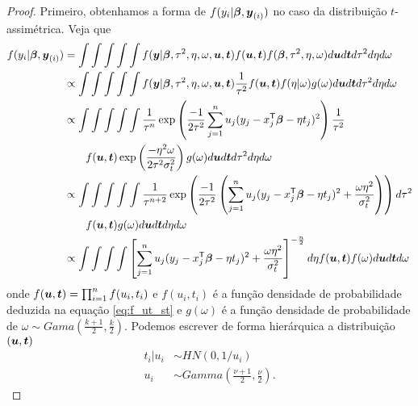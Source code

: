 \begin{proof}
Primeiro, obtenhamos a forma de  $f(y_i|{\boldsymbol{\beta}},{\boldsymbol{y}_{(i)}})$ no caso da distribuição $t$-assimétrica. Veja que 
\begin{equation}\label{eq:st_marg_1}
\begin{split}
f(y_i|{\boldsymbol{\beta}},{\boldsymbol{y}_{(i)}})  &= \int\int\int\int\int f({\boldsymbol{y}}|{\boldsymbol{\beta}},{\tau^2},\eta,\omega,{\boldsymbol{u}},{\boldsymbol{t}})f({\boldsymbol{u}},{\boldsymbol{t}}) f({\boldsymbol{\beta}},{\tau^2},\eta,\omega) d{\boldsymbol{u}} d{\boldsymbol{t}} d{\tau^2} d\eta d\omega \\
{}&\propto \int\int\int\int\int f({\boldsymbol{y}}|{\boldsymbol{\beta}},{\tau^2},\eta,\omega,{\boldsymbol{u}},{\boldsymbol{t}})\frac{1}{{\tau^2}}f({\boldsymbol{u}},{\boldsymbol{t}})f(\eta|\omega)g(\omega) d{\boldsymbol{u}} d{\boldsymbol{t}} d{\tau^2} d\eta d\omega  \\
{}& \propto  \int\int\int\int\int \frac{1}{\tau^n}\exp\left(\frac{-1}{2{\tau^2}}\sum_{j=1}^nu_j(y_j-x_j^{\mathsf{T}}{\boldsymbol{\beta}} - \eta t_j)^2\right)\frac{1}{{\tau^2}} \\
{}& \qquad  f({\boldsymbol{u}},{\boldsymbol{t}})\exp\left(\frac{-\eta^2\omega}{2{\tau^2}\sigma^2_t}\right)g(\omega)d{\boldsymbol{u}} d{\boldsymbol{t}} d{\tau^2} d\eta d\omega \\
{}& \propto \int\int\int\int \int \frac{1}{\tau^{n+2}}\exp\left(\frac{-1}{2{\tau^2}}\left(\sum_{j=1}^nu_j(y_j-x_j^{\mathsf{T}}{\boldsymbol{\beta}} - \eta t_j)^2+\frac{\omega\eta^2}{\sigma^2_t}\right)\right)  d{\tau^2} \\
{}& \qquad f({\boldsymbol{u}},{\boldsymbol{t}})g(\omega)d{\boldsymbol{u}} d{\boldsymbol{t}} d\eta d\omega  \\
{}& \propto  \int\int\int\int \left[\sum_{j=1}^nu_j(y_j-x_j^{\mathsf{T}}{\boldsymbol{\beta}} - \eta t_j)^2+\frac{\omega\eta^2}{\sigma^2_t}\right]^{-\frac{n}{2}} d\eta f({\boldsymbol{u}},{\boldsymbol{t}})f(\omega)d{\boldsymbol{u}} d{\boldsymbol{t}} d\omega
\end{split}
\end{equation}
onde $f({\boldsymbol{u}},{\boldsymbol{t}}) = \prod_{i=1}^nf(u_i,t_i)$ e $f(u_i,t_i)$ é a função densidade de probabilidade deduzida na equação \eqref{eq:f_ut_st} e $g(\omega)$ é a função densidade de probabilidade de $\omega\sim Gama(\frac{k+1}{2},\frac{k}{2})$. Podemos escrever de forma hierárquica a distribuição $({\boldsymbol{u}},{\boldsymbol{t}})$
\begin{equation}
\begin{split}
t_i|u_i & \sim HN(0,1/u_i) \\
u_i & \sim Gamma\left(\frac{\nu+1}{2},\frac{\nu}{2}\right).
\end{split}
\end{equation}


\end{proof}
